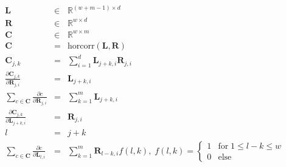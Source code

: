 \documentclass[varwidth=true, border=10pts]{standalone}
\begin{document}
\begin{eqnarray*}
    \mathbf{L} & \in & \mathbb{R}^{(w + m - 1) \times d} \\
    \mathbf{R} & \in & \mathbb{R}^{w \times d} \\
    \mathbf{C} & \in & \mathbb{R}^{w \times m} \\
    \mathbf{C} & = & \text{horcorr}(\mathbf{L}, \mathbf{R}) \\
    \mathbf{C}_{j, k} & = & \sum_{i = 1}^{d} \mathbf{L}_{j + k, i} \mathbf{R}_{j,i} \\
    \frac{\partial \mathbf{C}_{j, k}}{\partial \mathbf{R}_{j,i}} & = & \mathbf{L}_{j + k, i} \\
    \sum_{c \in \mathbf{C}} \frac{\partial c}{\partial \mathbf{R}_{j,i}} & = & \sum_{k = 1}^{m} \mathbf{L}_{j + k, i} \\
    \frac{\partial \mathbf{C}_{j, k}}{\partial \mathbf{L}_{j + k, i}} & = & \mathbf{R}_{j,i} \\
    l & = & j + k \\
    \sum_{c \in \mathbf{C}} \frac{\partial c}{\partial \mathbf{L}_{l, i}} & = & \sum_{k = 1}^{m}
        \mathbf{R}_{l - k,i} f(l, k), \; f(l, k) = \begin{cases} 1 & \text{for} \; 1 \leq l - k \leq w\\
        0 & \text{else}
    \end{cases}
\end{eqnarray*}
\end{document}
